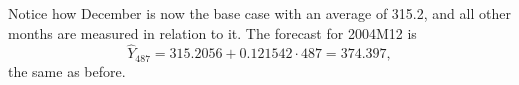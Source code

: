 \documentclass[11pt, a4paper]{article}
\begin{document}
\begin{enumerate}
\begin{enumerate}
\begin{center}
\end{center}
Notice how December is now the base case with an average of 315.2, and all other months are measured in relation to it.
The forecast for 2004M12 is
\[
\widehat{Y}_{487} = 315.2056+0.121542\cdot487=374.397,
\]
the same as before.
\end{enumerate}
\end{enumerate}
\end{document}
